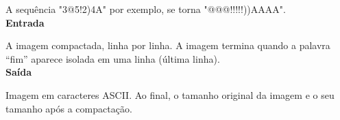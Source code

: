 \documentclass[a4paper, 12pt]{article}
\begin{document}
\newline \newline
A sequência "3@5!2)4A" por exemplo, se torna "@@@!!!!!))AAAA".
\\

\newline \newline
\textbf{{\large Entrada}} \newline

A imagem compactada, linha por linha. A imagem termina quando a palavra “fim” aparece isolada em uma linha (última linha).
\\

\newline \newline
\textbf{{\large Saída}} \newline

Imagem em caracteres ASCII. Ao final, o tamanho original da imagem e o seu tamanho após a compactação.
\newline
\\
\\
\newline \newline
\end{document}
